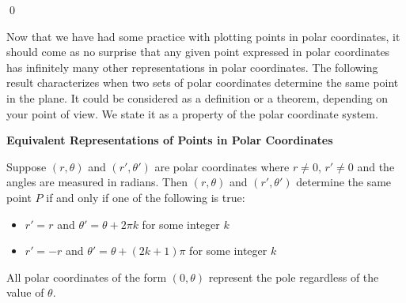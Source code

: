 \begin{ex}
\begin{enumerate}
\begin{center}
\begin{tabular}{cc}
\end{tabular}

\end{center}

\end{enumerate}

\vspace{-.25in} \qed

\end{ex}


Now that we have had some practice with plotting points in polar coordinates, it should come as no surprise that any given point expressed in polar coordinates has infinitely many other representations in polar coordinates.  The following result characterizes when two sets of polar coordinates determine the same point in the plane.  It could be considered as a definition or a theorem, depending on your point of view.  We state it as a property of the polar coordinate system.

\smallskip

\colorbox{ResultColor}{\bbm
\centerline{\textbf{Equivalent Representations of Points in Polar Coordinates}} 

\smallskip

Suppose $\left(r, \theta\right)$ and $\left(r', \theta'\right)$ are polar coordinates where $r \neq 0$, $r' \neq 0$ and the angles are measured in radians.  Then $\left(r, \theta\right)$ and $\left(r', \theta'\right)$  determine the same point $P$ if and only if one of the following is true:
 
 \begin{itemize}
 
 \item  $r' = r$ and $\theta' =  \theta + 2\pi k$ for some integer $k$
 
 \item  $r' = -r$ and $\theta' =  \theta + (2k + 1) \pi$ for some integer $k$
 
 \end{itemize}

All polar coordinates of the form $(0, \theta)$ represent the pole regardless of the value of $\theta$.

\ebm}

\smallskip

